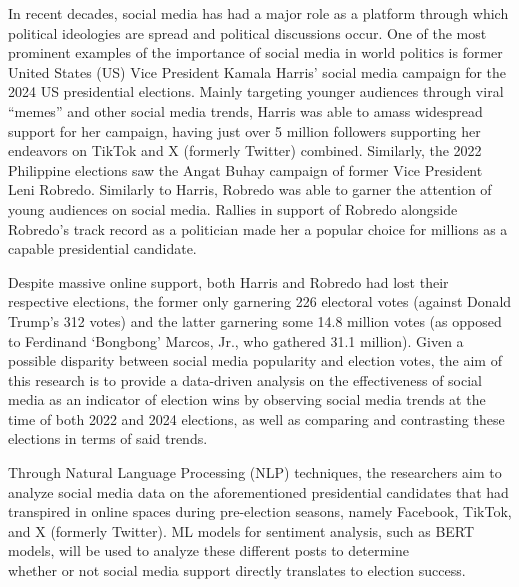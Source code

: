\begin{thesisabstract}
In recent decades, social media has had a major role as a platform through which political ideologies are spread and political discussions occur. One of the most prominent examples of the importance of social media in world politics is former United States (US) Vice President Kamala Harris’ social media campaign for the 2024 US presidential elections. Mainly targeting younger audiences through viral “memes” and other social media trends, Harris was able to amass widespread support for her campaign, having just over 5 million followers supporting her endeavors on TikTok and X (formerly Twitter) combined.\cite{CTX_Lee-2024} Similarly, the 2022 Philippine elections saw the Angat Buhay campaign of former Vice President Leni Robredo. Similarly to Harris, Robredo was able to garner the attention of young audiences on social media. Rallies in support of Robredo alongside Robredo’s track record as a politician made her a popular choice for millions as a capable presidential candidate.\cite{CTX_Johnson-2022}  

Despite massive online support, both Harris and Robredo had lost their respective elections, the former only garnering 226 electoral votes (against Donald Trump’s 312 votes) and the latter garnering some 14.8 million votes (as opposed to Ferdinand ‘Bongbong’ Marcos, Jr., who gathered 31.1 million).\cite{CTX_ABSCBN-2022,CTX_BBC-2024} Given a possible disparity between social media popularity and election votes, the aim of this research is to provide a data-driven analysis on the effectiveness of social media as an indicator of election wins by observing social media trends at the time of both 2022 and 2024 elections, as well as comparing and contrasting these elections in terms of said trends.
    
Through Natural Language Processing (NLP) techniques, the researchers aim to analyze social media data on the aforementioned presidential candidates that had transpired in online spaces during pre-election seasons, namely Facebook, TikTok, and X (formerly Twitter). ML models for sentiment analysis, such as BERT models, will be used to analyze these different posts to determine \\whether or not social media support directly translates to election success.
\end{thesisabstract}